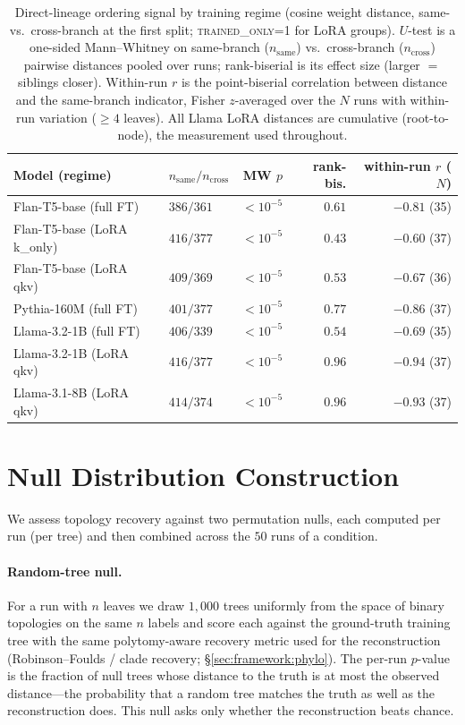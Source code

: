 \documentclass{article}
\theoremstyle{definition}
\theoremstyle{plain}
\begin{document}
\begin{table}[h]
\caption{Direct-lineage ordering signal by training regime (cosine weight distance, same-vs.\
  cross-branch at the first split; \textsc{trained\_only=1} for LoRA groups). $U$-test is a
  one-sided Mann--Whitney on same-branch ($n_{\text{same}}$) vs.\ cross-branch ($n_{\text{cross}}$)
  pairwise distances pooled over runs; rank-biserial is its effect size (larger $=$ siblings
  closer). Within-run $r$ is the point-biserial correlation between distance and the same-branch
  indicator, Fisher $z$-averaged over the $N$ runs with within-run variation ($\geq 4$ leaves).
  All Llama LoRA distances are cumulative (root-to-node), the measurement used throughout.}
\label{tab:direct}
\begin{center}
\begin{tabular}{llrrr}
\toprule
Model (regime) & $n_{\text{same}}/n_{\text{cross}}$ & MW $p$ & rank-bis. & within-run $r$ ($N$) \\
\midrule
Flan-T5-base (full FT)      & $386/361$ & $<10^{-5}$  & $0.61$ & $-0.81$ (35) \\
Flan-T5-base (LoRA k\_only) & $416/377$ & $<10^{-5}$  & $0.43$ & $-0.60$ (37) \\
Flan-T5-base (LoRA qkv)     & $409/369$ & $<10^{-5}$  & $0.53$ & $-0.67$ (36) \\
Pythia-160M (full FT)       & $401/377$ & $<10^{-5}$  & $0.77$ & $-0.86$ (37) \\
Llama-3.2-1B (full FT)      & $406/339$ & $<10^{-5}$  & $0.54$ & $-0.69$ (35) \\
Llama-3.2-1B (LoRA qkv)     & $416/377$ & $<10^{-5}$ & $0.96$ & $-0.94$ (37) \\
Llama-3.1-8B (LoRA qkv)     & $414/374$ & $<10^{-5}$ & $0.96$ & $-0.93$ (37) \\
\bottomrule
\end{tabular}
\end{center}
\end{table}

\section{Null Distribution Construction}
\label{app:null}

We assess topology recovery against two permutation nulls, each computed per run (per tree) and then
combined across the $50$ runs of a condition.

\paragraph{Random-tree null.} For a run with $n$ leaves we draw $1{,}000$ trees uniformly from the space
of binary topologies on the same $n$ labels and score each against the ground-truth training tree with
the same polytomy-aware recovery metric used for the reconstruction (Robinson--Foulds / clade
recovery; \S\ref{sec:framework:phylo}). The per-run $p$-value is the fraction of null trees whose
distance to the truth is at most the observed distance---the probability that a random tree matches the
truth as well as the reconstruction does. This null asks only whether the reconstruction beats chance.
\end{document}

